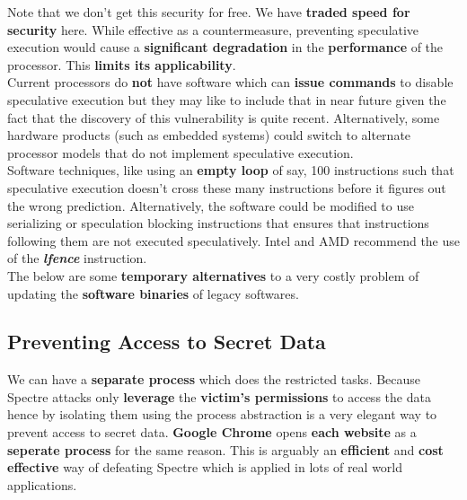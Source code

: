 \documentclass[12pt]{article}
\begin{document}
 Note that we don't get this security for free. We have \textbf{traded speed for security} here. While effective as a countermeasure, preventing speculative execution would cause a \textbf{significant degradation} in the \textbf{performance} of the processor. This \textbf{limits its applicability}. \\

Current processors do \textbf{not} have software which can \textbf{issue commands} to disable speculative execution but they may like to include that in near future given the fact that the discovery of this vulnerability is quite recent. Alternatively, some hardware products (such as embedded systems) could switch to alternate processor models that do not implement speculative execution. \\

Software techniques, like using an \textbf{empty loop} of say, 100 instructions such that speculative execution doesn't cross these many instructions before it figures out the wrong prediction.
Alternatively, the software could be modified to use serializing or speculation blocking instructions that ensures that instructions following them are not executed speculatively. Intel and AMD recommend the use of the \textbf{\textit{lfence}} instruction.\\

The below are some \textbf{temporary alternatives} to a very costly problem of updating the \textbf{software binaries} of legacy softwares.
\subsection{Preventing Access to Secret Data}
We can have a \textbf{separate process} which does the restricted tasks. Because Spectre attacks only \textbf{leverage} the \textbf{victim’s permissions} to access the data hence by isolating them using the process abstraction is a very elegant way to prevent access to secret data. \textbf{Google Chrome} opens \textbf{each website} as a \textbf{seperate process} for the same reason. This is arguably an \textbf{efficient} and \textbf{cost effective} way of defeating Spectre which is applied in lots of real world applications.
\end{document}

